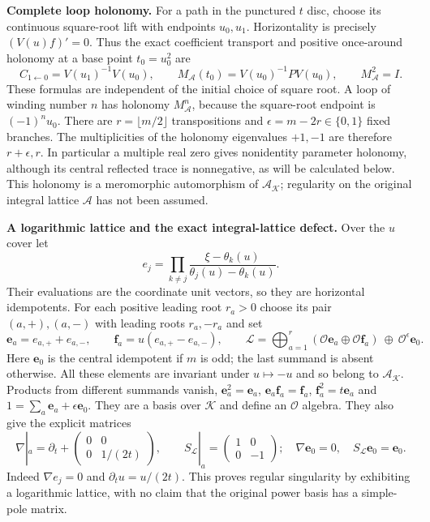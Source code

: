 \documentclass[11pt,a4paper]{article}
\theoremstyle{definition}\newtheorem{definition}[theorem]{Definition}
\begin{document}
\HH\textbf{Complete loop holonomy.}
For a path in the punctured $t$ disc, choose its continuous square-root
lift with endpoints $u_0,u_1$. Horizontality is precisely
$(V(u)f)'=0$. Thus the exact coefficient transport and positive
once-around holonomy at a base point $t_0=u_0^2$ are
\[
 C_{1\gets0}=V(u_1)^{-1}V(u_0),\qquad
 M_{\mathcal A}(t_0)=V(u_0)^{-1}P V(u_0),\qquad
 M_{\mathcal A}^2=I.
 \tag{HH9}\label{hh:monodromy}
\]
These formulas are independent of the initial choice of square root.
A loop of winding number $n$ has holonomy $M_{\mathcal A}^n$,
because the square-root endpoint is $(-1)^nu_0$.
There are $r=\lfloor m/2\rfloor$ transpositions and
$\epsilon=m-2r\in\{0,1\}$ fixed branches. The multiplicities of
the holonomy eigenvalues $+1,-1$ are therefore $r+\epsilon,r$.
In particular a multiple real zero gives nonidentity parameter
holonomy, although its central reflected trace is nonnegative,
as will be calculated below. This holonomy is a meromorphic
automorphism of $\mathcal A_{\mathcal K}$; regularity on the original
integral lattice $\mathcal A$ has not been assumed.

\HH\textbf{A logarithmic lattice and the exact integral-lattice defect.}
Over the $u$ cover let
\[
 e_j=\prod_{k\ne j}\frac{\xi-\theta_k(u)}
                               {\theta_j(u)-\theta_k(u)}.
 \tag{HH10}
\]
Their evaluations are the coordinate unit vectors, so they are
horizontal idempotents. For each positive leading root $r_a>0$
choose its pair $(a,+),(a,-)$ with leading roots $r_a,-r_a$ and set
\[
 \mathbf e_a=e_{a,+}+e_{a,-},\qquad
 \mathbf f_a=u(e_{a,+}-e_{a,-}),\qquad
 \mathcal L=\bigoplus_{a=1}^r
  (\mathcal O\mathbf e_a\oplus\mathcal O\mathbf f_a)
       \ \oplus\ \mathcal O^\epsilon\mathbf e_0 .
 \tag{HH11}\label{hh:loglattice}
\]
Here $\mathbf e_0$ is the central idempotent if $m$ is odd; the last
summand is absent otherwise. All these elements are invariant under
$u\mapsto-u$ and so belong to $\mathcal A_{\mathcal K}$.
Products from different summands vanish,
$\mathbf e_a^2=\mathbf e_a$,
$\mathbf e_a\mathbf f_a=\mathbf f_a$,
$\mathbf f_a^2=t\mathbf e_a$ and
$1=\sum_a\mathbf e_a+\epsilon\mathbf e_0$.
They are a basis over $\mathcal K$ and define an $\mathcal O$ algebra.
They also give the explicit matrices
\[
 \nabla|_a=\partial_t+
       \begin{pmatrix}0&0\\0&1/(2t)\end{pmatrix},\qquad
 S_{\mathcal L}|_a=\begin{pmatrix}1&0\\0&-1\end{pmatrix};
 \quad \nabla\mathbf e_0=0,\quad S_{\mathcal L}\mathbf e_0=\mathbf e_0 .
 \tag{HH12}\label{hh:logconnection}
\]
Indeed $\nabla e_j=0$ and $\partial_tu=u/(2t)$.
This proves regular singularity by exhibiting a logarithmic lattice,
with no claim that the original power basis has a simple-pole matrix.
\end{document}
